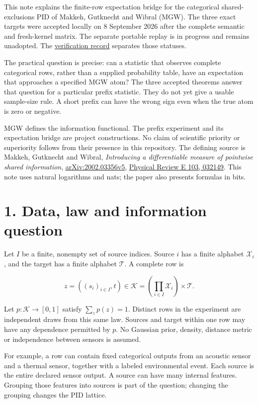 This note explains the finite-row expectation bridge for the categorical shared-exclusions PID of Makkeh, Gutknecht and Wibral (MGW). The three exact targets were accepted locally on 8 September 2026 after the complete semantic and fresh-kernel matrix. The separate portable replay is in progress and remains unadopted. The \href{../../evidence/prefix-mgw-mean-formal-verification-2026-09-08/RESULTS.md}{verification record} separates those statuses.

The practical question is precise: can a statistic that observes complete categorical rows, rather than a supplied probability table, have an expectation that approaches a specified MGW atom? The three accepted theorems answer that question for a particular prefix statistic. They do not yet give a usable sample-size rule. A short prefix can have the wrong sign even when the true atom is zero or negative.

MGW defines the information functional. The prefix experiment and its expectation bridge are project constructions. No claim of scientific priority or superiority follows from their presence in this repository. The defining source is Makkeh, Gutknecht and Wibral, \emph{Introducing a differentiable measure of pointwise shared information}, \href{https://arxiv.org/abs/2002.03356v5}{arXiv:2002.03356v5}, \href{https://doi.org/10.1103/PhysRevE.103.032149}{Physical Review E 103, 032149}. This note uses natural logarithms and nats; the paper also presents formulas in bits.

\section{1. Data, law and information question}\label{data-law-and-information-question}

Let \(I\) be a finite, nonempty set of source indices. Source \(i\) has a finite alphabet \(\mathcal X_i\), and the target has a finite alphabet \(\mathcal T\). A complete row is

\[
z=((s_i)_{i\in I},t)\in\mathcal K
   =\left(\prod_{i\in I}\mathcal X_i\right)\times\mathcal T.
\]

Let \(p:\mathcal K\to[0,1]\) satisfy \(\sum_zp(z)=1\). Distinct rows in the experiment are independent draws from this same law. Sources and target within one row may have any dependence permitted by \(p\). No Gaussian prior, density, distance metric or independence between sensors is assumed.

For example, a row can contain fixed categorical outputs from an acoustic sensor and a thermal sensor, together with a labeled environmental event. Each source is the entire declared sensor output. A source can have many internal features. Grouping those features into sources is part of the question; changing the grouping changes the PID lattice.

